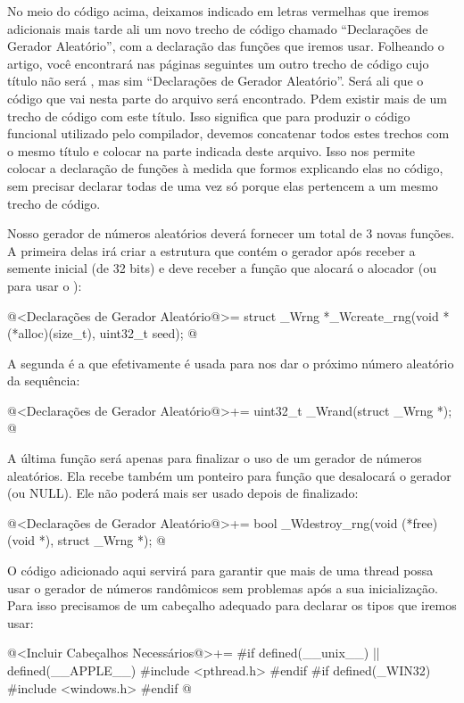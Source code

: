 No meio do código acima, deixamos indicado em letras vermelhas que
iremos adicionais mais tarde ali um novo trecho de código chamado
``Declarações de Gerador Aleatório'', com a declaração das funções que
iremos usar. Folheando o artigo, você encontrará nas páginas seguintes
um outro trecho de código cujo título não será ,
mas sim ``Declarações de Gerador Aleatório''. Será ali que o código que
vai nesta parte do arquivo será encontrado. Pdem existir mais de um
trecho de código com este título. Isso significa que para produzir o
código funcional utilizado pelo compilador, devemos concatenar todos
estes trechos com o mesmo título e colocar na parte indicada deste
arquivo. Isso nos permite colocar a declaração de funções à medida que
formos explicando elas no código, sem precisar declarar todas de uma
vez só porque elas pertencem a um mesmo trecho de código.


Nosso gerador de números aleatórios deverá fornecer um total de 3
novas funções. A primeira delas irá criar a estrutura que contém o
gerador após receber a semente inicial (de 32 bits) e deve receber a
função que alocará o alocador (ou  para usar
o ):

\iniciocodigo
@<Declarações de Gerador Aleatório@>=
struct _Wrng *_Wcreate_rng(void *(*alloc)(size_t), uint32_t seed);
@
\fimcodigo

A segunda é a que efetivamente é usada para nos dar o próximo número
aleatório da sequência:

\iniciocodigo
@<Declarações de Gerador Aleatório@>+=
uint32_t _Wrand(struct _Wrng *);
@
\fimcodigo

A última função será apenas para finalizar o uso de um gerador de
números aleatórios. Ela recebe também um ponteiro para função que
desalocará o gerador (ou NULL). Ele não poderá mais ser usado depois
de finalizado:

\iniciocodigo
@<Declarações de Gerador Aleatório@>+=
bool _Wdestroy_rng(void (*free)(void *), struct _Wrng *);
@
\fimcodigo


O código adicionado aqui servirá para garantir que mais de uma thread
possa usar o gerador de números randômicos sem problemas após a sua
inicialização. Para isso precisamos de um cabeçalho adequado para
declarar os tipos que iremos usar:

\iniciocodigo
@<Incluir Cabeçalhos Necessários@>+=
#if defined(__unix__) || defined(__APPLE__)
#include <pthread.h>
#endif
#if defined(_WIN32)
#include <windows.h>
#endif
@
\fimcodigo

